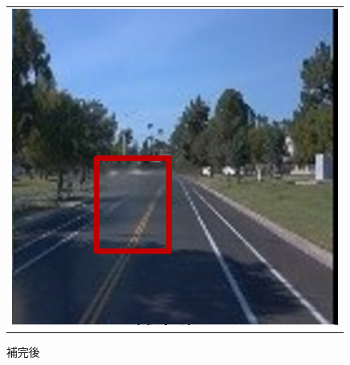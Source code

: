 \documentclass[a4j, 11pt]{jreport}
\begin{document}
\begin{figure}[H]
\begin{tabular}{c}
   
		\begin{minipage}{0.50\hsize}
		  \centering
			\includegraphics[scale=0.5]
			{images/result/completion/result1-2.png}
			\caption{補完後}
			\label{fig:completion1-2}
		\end{minipage} \\
	\end{tabular}
\end{figure}
\end{document}
